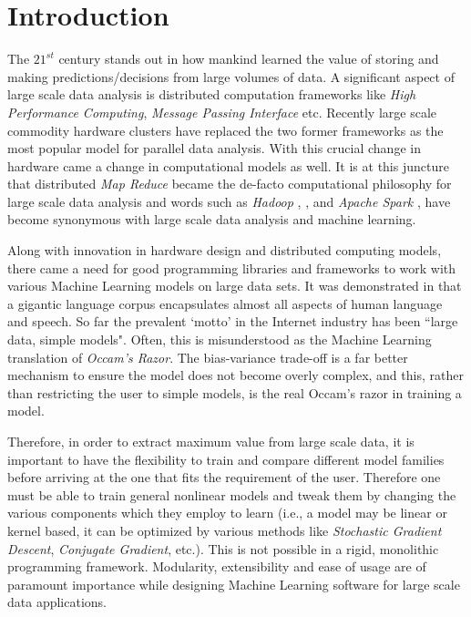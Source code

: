 \documentclass[conference, cmex10]{IEEEtran}
\begin{document}
\section{Introduction} \label{introduction}
The $21^{st}$ century stands out in how mankind learned the value of storing and making predictions/decisions from large volumes of data. A significant aspect of large scale data analysis is distributed computation frameworks like \textit{High Performance Computing}, \textit{Message Passing Interface} etc. Recently large scale commodity hardware clusters have replaced the two former frameworks as the most popular model for parallel data analysis. With this crucial change in hardware came a change in computational models as well. It is at this juncture that distributed \textit{Map Reduce} became the de-facto computational philosophy for large scale data analysis and  words such as \textit{Hadoop} \cite{Hadoop:2005}, \cite{chang2008bigtable}, \cite{Borthakur2011} and \textit{Apache Spark} \cite{Zaharia2010}, \cite{Spark:2010} have become synonymous with large scale data analysis and machine learning.

Along with innovation in hardware design and distributed computing models, there came a need for good programming libraries and frameworks to work with various Machine Learning models on large data sets. It was demonstrated in \cite{10.1109/MIS.2009.36} that a gigantic language corpus encapsulates almost all aspects of human language and speech. So far the prevalent `motto' in the Internet industry has been ``large data, simple models". Often, this is misunderstood as the Machine Learning translation of \textit{Occam's Razor}. The bias-variance trade-off \cite{Valentini2004} is a far better mechanism to ensure the model does not become overly complex, and this, rather than restricting the user to simple models, is the real Occam's razor in training a model. 

Therefore, in order to extract maximum value from large scale data, it is important to have the flexibility to train and compare different model families before arriving at the one that fits the requirement of the user. Therefore one must be able to train general nonlinear models and tweak them by changing the various components which they employ to learn (i.e., a model may be linear or kernel based, it can be optimized by various methods like \textit{Stochastic Gradient Descent}, \textit{Conjugate Gradient}, etc.). This is not possible in a rigid, monolithic programming framework. Modularity, extensibility and ease of usage are of paramount importance while designing Machine Learning software for large scale data applications.
\end{document}
